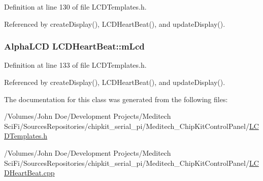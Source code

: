 Definition at line 130 of file L\-C\-D\-Templates.\-h.



Referenced by create\-Display(), L\-C\-D\-Heart\-Beat(), and update\-Display().

\hypertarget{class_l_c_d_heart_beat_a4ca0c070f107ad510da6d866f1333790}{
\subsubsection[{m\-Lcd}]{\setlength{\rightskip}{0pt plus 5cm}Alpha\-L\-C\-D L\-C\-D\-Heart\-Beat\-::m\-Lcd\hspace{0.3cm}{\ttfamily [private]}}}\label{class_l_c_d_heart_beat_a4ca0c070f107ad510da6d866f1333790}


Definition at line 133 of file L\-C\-D\-Templates.\-h.



Referenced by create\-Display(), L\-C\-D\-Heart\-Beat(), and update\-Display().



The documentation for this class was generated from the following files\-:\begin{DoxyCompactItemize}
\item 
/\-Volumes/\-John Doe/\-Development Projects/\-Meditech Sci\-Fi/\-Sources\-Repositories/chipkit\-\_\-serial\-\_\-pi/\-Meditech\-\_\-\-Chip\-Kit\-Control\-Panel/\hyperlink{_l_c_d_templates_8h}{L\-C\-D\-Templates.\-h}\item 
/\-Volumes/\-John Doe/\-Development Projects/\-Meditech Sci\-Fi/\-Sources\-Repositories/chipkit\-\_\-serial\-\_\-pi/\-Meditech\-\_\-\-Chip\-Kit\-Control\-Panel/\hyperlink{_l_c_d_heart_beat_8cpp}{L\-C\-D\-Heart\-Beat.\-cpp}\end{DoxyCompactItemize}
